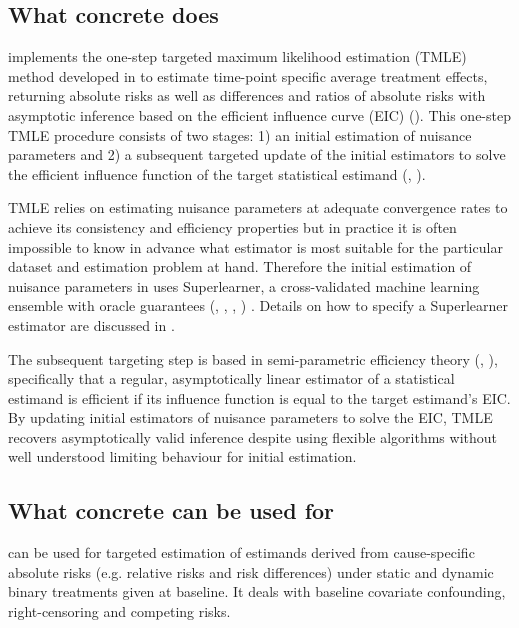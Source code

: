 \documentclass{report}
\newcommand{\1}{\ensuremath{\mathbf{1}}}
\begin{document}
\subsection{What concrete does}
\label{sec:org1ae490f}
 implements the one-step targeted maximum likelihood estimation (TMLE) method developed in \cite{rytgaard_one-step_2021} to estimate time-point specific average treatment effects, returning absolute risks as well as differences and ratios of absolute risks with asymptotic inference based on the efficient influence curve (EIC) (\cite{laan_unified_2003-1}). This one-step TMLE procedure consists of two stages: 1) an initial estimation of nuisance parameters and 2) a subsequent targeted update of the initial estimators to solve the efficient influence function of the target statistical estimand (\cite{laan_unified_2003-1}, \cite{kennedy_semiparametric_2016}).

TMLE relies on estimating nuisance parameters at adequate convergence rates to achieve its consistency and efficiency properties but in practice it is often impossible to know in advance what estimator is most suitable for the particular dataset and estimation problem at hand. Therefore the initial estimation of nuisance parameters in  uses Superlearner, a cross-validated machine learning ensemble with oracle guarantees (\cite{laan_super_2007}, \cite{polley_superlearner_2021}, \cite{laan_unified_2003}, \cite{vaart_oracle_2006})
. Details on how to specify a Superlearner estimator are discussed in \cite{phillips_practical_2022}.

The subsequent targeting step is based in semi-parametric efficiency theory (\cite{laan_targeted_2011}, \cite{kennedy_semiparametric_2016}), specifically that a regular, asymptotically linear estimator of a statistical estimand is efficient if its influence function is equal to the target estimand's EIC. By updating initial estimators of nuisance parameters to solve the EIC, TMLE recovers asymptotically valid inference despite using flexible algorithms without well understood limiting behaviour for initial estimation.

\subsection{What concrete can be used for}
\label{sec:org3ef7e33}
 can be used for targeted estimation of estimands derived from cause-specific absolute risks (e.g. relative risks and risk differences) under static and dynamic binary treatments given at baseline. It deals with baseline covariate confounding, right-censoring and competing risks.
\end{document}
